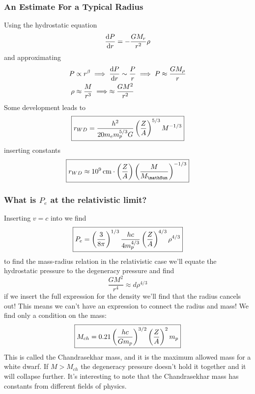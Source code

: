 \subsubsection{An Estimate For a Typical Radius}
Using the hydrostatic equation
\begin{equation}
    \diff{P}{r} = -\frac{GM_r}{r^2}\rho
\end{equation}
and approximating
\begin{align}
    P &\propto r^\beta \implies \diff{P}{r} \sim \frac{P}{r} \implies P\approx \frac{GM_\rho}{r} \\
    \rho &\approx \frac{M}{r^3} \implies \approx\frac{GM^2}{r^2}
\end{align}
Some development leads to
\begin{equation}
    \boxed{r_{WD} = \frac{h^2}{20 m_e m_p^{5/3}G}\left(\frac{Z}{A}\right)^{5/3}M^{-1/3}}
\end{equation}
inserting constants
\begin{equation}
    \boxed{r_{WD} \approx \qty{e9}{\centi\meter} \cdot \ins{\frac{Z}{A}}\ins{\frac{M}{M_\mathSun}}^{-1/3}} 
\end{equation}
\subsubsection{What is \(P_e\) at the relativistic limit?}
Inserting \(v=c\) into  we find
\begin{equation}
    \boxed{P_e = \left(\frac{3}{8\pi}\right)^{1/3}\frac{hc}{4m_p^{4/3}}\left(\frac{Z}{A}\right)^{4/3}\rho^{4/3}}
\end{equation}
to find the mass-radius relation in the relativistic case we'll equate the hydrostatic pressure to the degeneracy pressure and find
\begin{equation}
    \frac{GM^2}{r^4} \approx d\rho^{4/3}
\end{equation}
if we insert the full expression for the density we'll find that the radius cancels out! This means we can't have an expression to connect the radius and mass! We find only a condition on the mass:
\begin{equation}
    \boxed{M_{ch} = 0.21 \left(\frac{hc}{Gm_p}\right)^{3/2}\left(\frac{Z}{A}\right)^2 m_p}
\end{equation}
This is called the Chandrasekhar mass, and it is the maximum allowed mass for a white dwarf. If \(M>M_{ch}\) the degeneracy pressure doesn't hold it together and it will collapse further. It's interesting to note that the Chandrasekhar mass has constants from different fields of physics.
